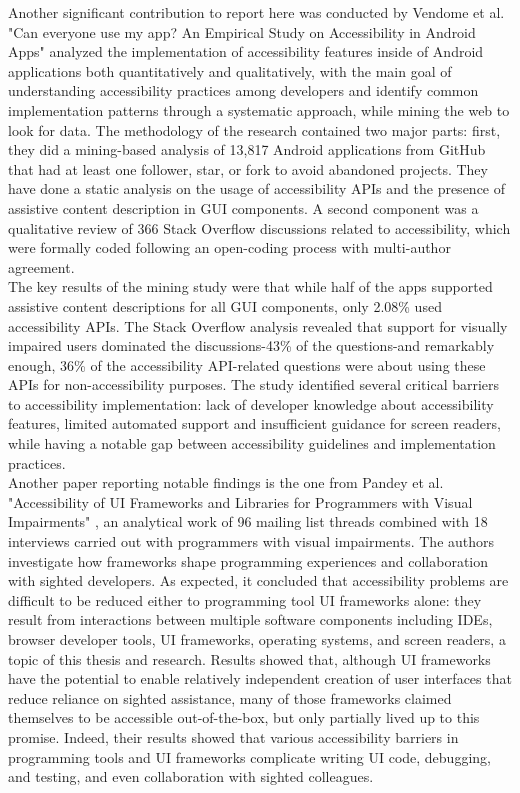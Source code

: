 Another significant contribution to report here was conducted by Vendome et al. "Can everyone use my app? An Empirical Study on Accessibility in Android Apps" \cite{vendome2019can} analyzed the implementation of accessibility features inside of Android applications both quantitatively and qualitatively, with the main goal of understanding accessibility practices among developers and identify common implementation patterns through a systematic approach, while mining the web to look for data. The methodology of the research contained two major parts: first, they did a mining-based analysis of 13,817 Android applications from GitHub that had at least one follower, star, or fork to avoid abandoned projects. They have done a static analysis on the usage of accessibility APIs and the presence of assistive content description in GUI components. A second component was a qualitative review of 366 Stack Overflow discussions related to accessibility, which were formally coded following an open-coding process with multi-author agreement. \\

The key results of the mining study were that while half of the apps supported assistive content descriptions for all GUI components, only 2.08\% used accessibility APIs. The Stack Overflow analysis revealed that support for visually impaired users dominated the discussions-43\% of the questions-and remarkably enough, 36\% of the accessibility API-related questions were about using these APIs for non-accessibility purposes.
The study identified several critical barriers to accessibility implementation: lack of developer knowledge about accessibility features, limited automated support and insufficient guidance for screen readers, while having a notable gap between accessibility guidelines and implementation practices. \\

Another paper reporting notable findings is the one from Pandey et al. "Accessibility of UI Frameworks and Libraries for Programmers with Visual Impairments" \cite{pandey2022accessibility}, an analytical work of 96 mailing list threads combined with 18 interviews carried out with programmers with visual impairments. The authors investigate how frameworks shape programming experiences and collaboration with sighted developers. As expected, it concluded that accessibility problems are difficult to be reduced either to programming tool UI frameworks alone: they result from interactions between multiple software components including IDEs, browser developer tools, UI frameworks, operating systems, and screen readers, a topic of this thesis and research. Results showed that, although UI frameworks have the potential to enable relatively independent creation of user interfaces that reduce reliance on sighted assistance, many of those frameworks claimed themselves to be accessible out-of-the-box, but only partially lived up to this promise. Indeed, their results showed that various accessibility barriers in programming tools and UI frameworks complicate writing UI code, debugging, and testing, and even collaboration with sighted colleagues. \\

